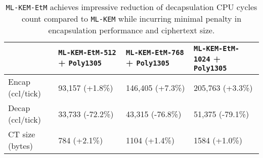 \documentclass[runningheads]{llncs}
\begin{document}
\begin{table}[h]
    \centering
    \footnotesize

    \begin{tabular}{|p{5em}|p{8em}|p{8em}|p{8em}|}
        \hline
        & \texttt{ML-KEM-EtM-512} \newline + \texttt{Poly1305}
        & \texttt{ML-KEM-EtM-768} \newline + \texttt{Poly1305}
        & \texttt{ML-KEM-EtM-1024} \newline + \texttt{Poly1305}
        \\
        \hline
        Encap \newline (ccl/tick) 
        & 93,157 \newline (+1.8\%) 
        & 146,405 \newline (+7.3\%) 
        & 205,763 \newline (+3.3\%) 
        \\
        \hline
        Decap \newline (ccl/tick) 
        & 33,733 \newline (-72.2\%) 
        & 43,315 \newline (-76.8\%) 
        & 51,375 \newline (-79.1\%) 
        \\
        \hline
        CT size \newline (bytes) 
        & 784 \newline (+2.1\%) 
        & 1104 \newline (+1.4\%) 
        & 1584 \newline (+1.0\%) 
        \\
        \hline
    \end{tabular}\vspace{0.8em}

    \caption{\texttt{ML-KEM-EtM} achieves impressive reduction of decapsulation CPU cycles count compared to \texttt{ML-KEM} while incurring minimal penalty in encapsulation performance and ciphertext size.}\label{tbl:cpu-cycles-summary}
\end{table}

\end{document}
